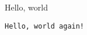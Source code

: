 \documentclass{scrreprt}
\begin{document}
	Hello, world
	
	\texttt{Hello, world again!}
\end{document}
